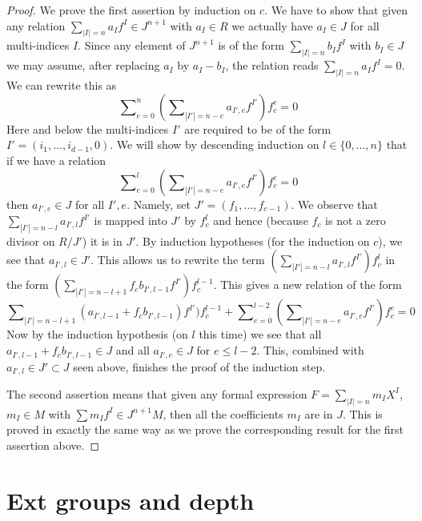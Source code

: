 \begin{proof}
We prove the first assertion by induction on $c$.
We have to show that given any relation
$\sum_{|I| = n} a_I f^I \in J^{n + 1}$ with $a_I \in R$ we
actually have $a_I \in J$ for all multi-indices $I$. Since
any element of $J^{n+1}$ is of the form $\sum_{|I| = n} b_I f^I$
with $b_I \in J$ we may assume, after replacing $a_I$ by $a_I - b_I$,
the relation reads $\sum_{|I| = n} a_I f^I = 0$. We can rewrite 
this as
$$
\sum\nolimits_{e = 0}^n
\left(
\sum\nolimits_{|I'| = n - e}
a_{I',e} f^{I'}
\right)
f_c^e
=
0
$$
Here and below the multi-indices $I'$ are required to be of the form
$I'=(i_1,\ldots,i_{d-1},0)$. We will show by descending
induction on $l \in \{0,\ldots,n\}$
that if we have a relation
$$
\sum\nolimits_{e = 0}^l
\left(
\sum\nolimits_{|I'| = n - e}
a_{I',e} f^{I'}
\right)
f_c^e
=
0
$$
then $a_{I',e} \in J$ for all $I', e$.
Namely, set $J' = (f_1,\ldots,f_{c-1})$.
We observe that $\sum\nolimits_{|I'| = n - l} a_{I',l} f^{I'}$
is mapped into $J'$ by $f_c^{l}$ and hence
(because $f_c$ is not a zero divisor on $R/J'$) it is in $J'$.
By induction hypotheses (for the induction on $c$),
we see that $a_{I',l} \in J'$.
This allows us to rewrite the term 
$(\sum\nolimits_{|I'| = n - l} a_{I',l} f^{I'})f_c^l$
in the form $(\sum\nolimits_{|I'| = n - l + 1} f_c b_{I',l - 1} 
f^{I'})f_c^{l-1}$. This gives a new relation of the form
$$
\sum\nolimits_{|I'| = n - l + 1}
(a_{I', l-1} + f_c b_{I',l - 1}) f^{I'})f_c^{l-1}
+
\sum\nolimits_{e = 0}^{l - 2}
\left(
\sum\nolimits_{|I'| = n - e}
a_{I',e} f^{I'}
\right)
f_c^e
=
0
$$
Now by the induction hypothesis (on $l$ this time) we see that
all $a_{I', l-1} + f_c b_{I',l - 1} \in J$ and
all $a_{I', e} \in J$ for $e \leq l - 2$. This, combined with
$a_{I', l} \in J' \subset J$ seen above, finishes the proof of the
induction step.

\medskip\noindent
The second assertion means that given any formal expression
$F = \sum_{|I| = n} m_I X^I$, $m_I \in M$ with $\sum m_I f^I
\in J^{n+1}M$, then all the coefficients $m_I$ are in $J$.
This is proved in exactly the same way as we prove the corresponding
result for the first assertion above.
\end{proof}











\section{Ext groups and depth}
\label{section-ext}

